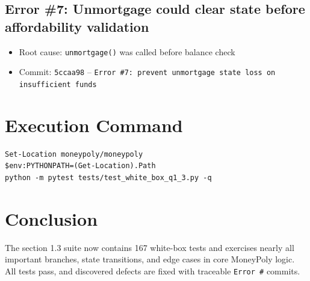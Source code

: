 \documentclass[11pt,a4paper]{article}
\begin{document}
\subsection*{Error \#7: Unmortgage could clear state before affordability validation}
\begin{itemize}
  \item Root cause: \texttt{unmortgage()} was called before balance check
  \item Commit: \texttt{5ccaa98} -- \texttt{Error \#7: prevent unmortgage state loss on insufficient funds}
\end{itemize}

\section*{Execution Command}
\begin{verbatim}
Set-Location moneypoly/moneypoly
$env:PYTHONPATH=(Get-Location).Path
python -m pytest tests/test_white_box_q1_3.py -q
\end{verbatim}

\section*{Conclusion}
The section 1.3 suite now contains 167 white-box tests and exercises nearly all important branches, state transitions, and edge cases in core MoneyPoly logic. All tests pass, and discovered defects are fixed with traceable \texttt{Error \#} commits.
\end{document}
